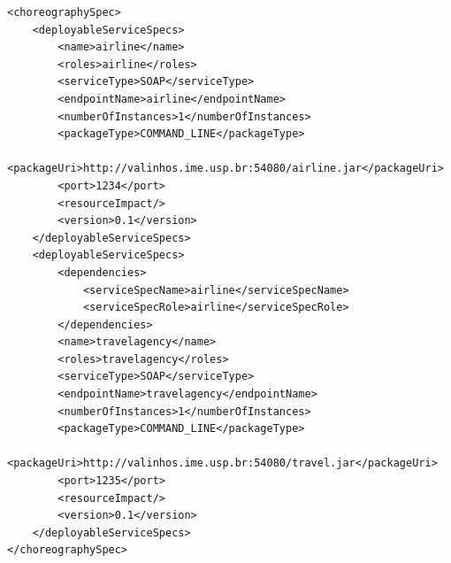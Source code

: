 \documentclass[a4paper, 10pt]{article}
\begin{document}
{\footnotesize

\lstset{language=XML}

\begin{lstlisting}[caption=ChorSpec XML representation example, label=lst:chor_spec_xml]
<choreographySpec>
    <deployableServiceSpecs>
        <name>airline</name>
        <roles>airline</roles>
        <serviceType>SOAP</serviceType>
        <endpointName>airline</endpointName>
        <numberOfInstances>1</numberOfInstances>
        <packageType>COMMAND_LINE</packageType>
        <packageUri>http://valinhos.ime.usp.br:54080/airline.jar</packageUri>
        <port>1234</port>
        <resourceImpact/>
        <version>0.1</version>
    </deployableServiceSpecs>
    <deployableServiceSpecs>
        <dependencies>
            <serviceSpecName>airline</serviceSpecName>
            <serviceSpecRole>airline</serviceSpecRole>
        </dependencies>
        <name>travelagency</name>
        <roles>travelagency</roles>
        <serviceType>SOAP</serviceType>
        <endpointName>travelagency</endpointName>
        <numberOfInstances>1</numberOfInstances>
        <packageType>COMMAND_LINE</packageType>
        <packageUri>http://valinhos.ime.usp.br:54080/travel.jar</packageUri>
        <port>1235</port>
        <resourceImpact/>
        <version>0.1</version>
    </deployableServiceSpecs>
</choreographySpec>
\end{lstlisting}

}
\end{document}
